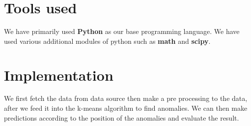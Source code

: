 \documentclass[12pt]{report}
\begin{document}
\section*{Tools used}
We have primarily used \textbf{ Python} as our base programming language.
We have used various additional modules of python such as \textbf{math} and \textbf{ scipy}.

\newpage
\section*{Implementation}
We first fetch the data from data source then make
a pre processing to the data, after we feed it into the k-means
algorithm to find anomalies. We can then make predictions according to the position of the anomalies and evaluate the result.
\end{document}
